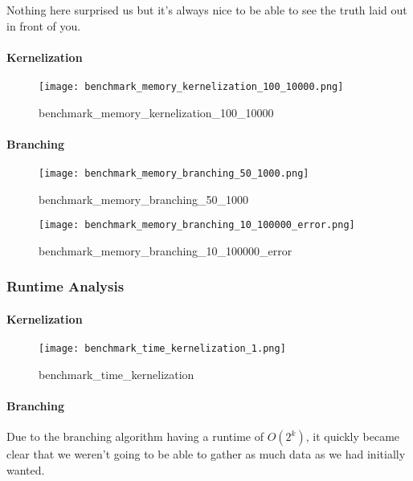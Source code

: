 Nothing here surprised us but it's always nice to be able to see the
truth laid out in front of you.

\paragraph{Kernelization}

\begin{figure}[h]
    \centering
    \texttt{[image: benchmark\_memory\_kernelization\_100\_10000.png]}
    \caption{benchmark\_memory\_kernelization\_100\_10000}
\end{figure}

\paragraph{Branching}

\begin{figure}[h]
    \centering
    \texttt{[image: benchmark\_memory\_branching\_50\_1000.png]}
    \caption{benchmark\_memory\_branching\_50\_1000}
\end{figure}

\begin{figure}[h]
    \centering
    \texttt{[image: benchmark\_memory\_branching\_10\_100000\_error.png]}
    \caption{benchmark\_memory\_branching\_10\_100000\_error}
\end{figure}

\subsubsection{Runtime Analysis}

\paragraph{Kernelization}

\begin{figure}[h]
    \centering
    \texttt{[image: benchmark\_time\_kernelization\_1.png]}
    \caption{benchmark\_time\_kernelization}
\end{figure}

\paragraph{Branching}

Due to the branching algorithm having a runtime of \(O(2^k)\), it
quickly became clear that we weren't going to be able to gather as much
data as we had initially wanted.

